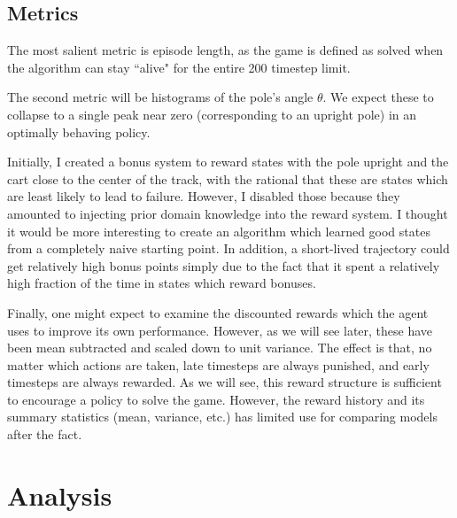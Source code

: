 \documentclass[12pt,a4paper]{article}
\begin{document}
\subsection*{Metrics}

The most salient metric is episode length, as the game is defined as solved when the algorithm can stay ``alive" for the entire 200 timestep limit.

The second metric will be histograms of the pole's angle $\theta$. We expect these to collapse to a single peak near zero (corresponding to an upright pole) in an optimally behaving policy.

Initially, I created a bonus system to reward states with the pole upright and the cart close to the center of the track, with the rational that these are states which are least likely to lead to failure. However, I disabled those because they amounted to injecting prior domain knowledge into the reward system. I thought it would be more interesting to create an algorithm which learned good states from a completely naive starting point. In addition, a short-lived trajectory could get relatively high bonus points simply due to the fact that it spent a relatively high fraction of the time in states which reward bonuses.

Finally, one might expect to examine the discounted rewards which the agent uses to improve its own performance. However, as we will see later, these have been mean subtracted and scaled down to unit variance. The effect is that, no matter which actions are taken, late timesteps are always punished, and early timesteps are always rewarded. As we will see, this reward structure is sufficient to encourage a policy to solve the game. However, the reward history and its summary statistics (mean, variance, etc.) has limited use for comparing models after the fact.


\section{Analysis}
%
\end{document}
